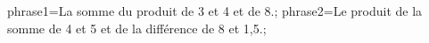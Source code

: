 \documentclass[exercice]{thedocument}%
\begin{document}
%
    \>phrase1={La somme du produit de 3 et 4 et de 8.};%
    \>phrase2={Le produit de la somme de 4 et 5 et de la différence de 8 et 1,5.};%
\end{document}
